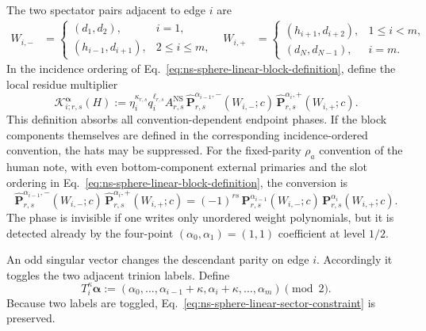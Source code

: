 \documentclass[11pt]{article}
\newcommand{\NS}{\mathrm{NS}}
\begin{document}
The two spectator pairs adjacent to edge \(i\) are
\begin{align}
 W_{i,-}
 &=
 \begin{cases}
 (d_1,d_2),&i=1,\\
 (h_{i-1},d_{i+1}),&2\leq i\leq m,
 \end{cases}
 &
 W_{i,+}
 &=
 \begin{cases}
 (h_{i+1},d_{i+2}),&1\leq i<m,\\
 (d_N,d_{N-1}),&i=m.
 \end{cases}
 \label{eq:ns-sphere-linear-spectator-pairs}
\end{align}
In the incidence ordering of
Eq.~\eqref{eq:ns-sphere-linear-block-definition}, define the local residue
multiplier
\begin{equation}
 \mathcal K^{\boldsymbol\alpha}_{i;r,s}(H)
 :=
 \eta_i^{\kappa_{r,s}}q_i^{\ell_{r,s}}
 A^{\NS}_{r,s}\,
 \widehat{\mathbf P}^{\alpha_{i-1},-}_{r,s}(W_{i,-};c)\,
 \widehat{\mathbf P}^{\alpha_i,+}_{r,s}(W_{i,+};c).
 \label{eq:ns-sphere-linear-local-kernel}
\end{equation}
This definition absorbs all convention-dependent endpoint phases.  If the
block components themselves are defined in the corresponding
incidence-ordered convention, the hats may be suppressed.
For the fixed-parity \(\rho_a\) convention of the human note, with even
bottom-component external primaries and the slot ordering in
Eq.~\eqref{eq:ns-sphere-linear-block-definition}, the conversion is
\begin{equation}
 \widehat{\mathbf P}^{\alpha_{i-1},-}_{r,s}(W_{i,-};c)\,
 \widehat{\mathbf P}^{\alpha_i,+}_{r,s}(W_{i,+};c)
 =
 (-1)^{rs}\,
 \mathbf P^{\alpha_{i-1}}_{r,s}(W_{i,-};c)\,
 \mathbf P^{\alpha_i}_{r,s}(W_{i,+};c).
 \label{eq:ns-sphere-linear-fixed-parity-phase}
\end{equation}
The phase is invisible if one writes only unordered weight polynomials, but
it is detected already by the four-point
\((\alpha_0,\alpha_1)=(1,1)\) coefficient at level \(1/2\).

An odd singular vector changes the descendant parity on edge \(i\).
Accordingly it toggles the two adjacent trinion labels.  Define
\begin{equation}
 T_i^{\kappa}\boldsymbol\alpha
 :=
 (\alpha_0,\ldots,
 \alpha_{i-1}+\kappa,\alpha_i+\kappa,
 \ldots,\alpha_m)
 \pmod2.
 \label{eq:ns-sphere-linear-routing-transport}
\end{equation}
Because two labels are toggled,
Eq.~\eqref{eq:ns-sphere-linear-sector-constraint} is preserved.
\end{document}
